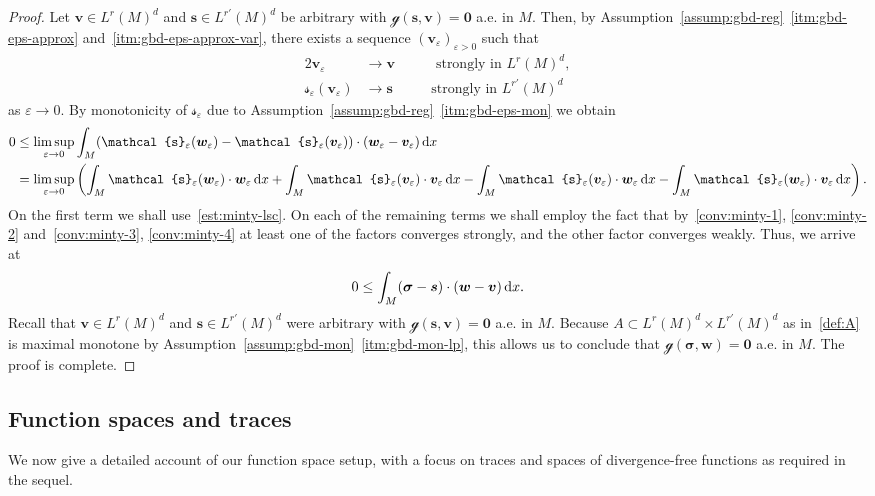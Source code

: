 \documentclass[reqno,a4paper]{amsart}
\def\vec#1{\boldsymbol{#1}}
\def\d{{\rm d}}
\def\dx{\,\d x}
\def\b0{\vec{0}}
\def\bs{\vec{s}}
\def\bv{\vec{v}}
\def\bw{\vec{w}}
\def\bsigma{\vec{\sigma}}
\def\gbd{\vec{\mathcal{g}}}
\def\Srel{\vec{\mathcal{s}}}
\def\Seps{\Srel_{\varepsilon}}
\begin{document}
	\begin{proof}
		Let $\bv \in L^r(M)^d$ and $\bs \in L^{r'}(M)^{d}$ be arbitrary with $\gbd(\bs,\bv)= \b0 $ a.e. in $M$. 
		Then, by Assumption~\ref{assump:gbd-reg}~\ref{itm:gbd-eps-approx} and~\ref{itm:gbd-eps-approx-var}, there exists a sequence $(\bv_{\varepsilon})_{\varepsilon>0}$ such that
		\begin{alignat}{2}\label{conv:minty-3}
			\bv_{\varepsilon} &\to \bv \quad &&\text{ strongly in } L^{r}(M)^d,\\ \label{conv:minty-4}
			\Seps(\bv_{\varepsilon}) &\to \bs && \text{strongly in } L^{r'}(M)^d
		\end{alignat}
		as $\varepsilon \to 0$. 
		By monotonicity of $\Seps$ due to Assumption~\ref{assump:gbd-reg}~\ref{itm:gbd-eps-mon} we obtain 
		\begin{align*}
			0&  \leq \limsup_{\varepsilon \to 0} \int_{M} (\Seps(\bw_{\varepsilon}) - \Seps(\bv_{\varepsilon})) \cdot (\bw_{\varepsilon} - \bv_{\varepsilon})  \dx \\
			&= \limsup_{\varepsilon \to 0}  
			\left( 
			\int_{M}  \Seps(\bw_{\varepsilon}) \cdot \bw_{\varepsilon}  \dx 
			+ 	\int_{M}  \Seps(\bv_{\varepsilon}) \cdot  \bv_{\varepsilon}  \dx 
			- 	\int_{M}   \Seps(\bv_{\varepsilon}) \cdot \bw_{\varepsilon} \dx 
			- 	\int_{M}  \Seps(\bw_{\varepsilon}) \cdot  \bv_{\varepsilon} \dx 
			\right).
		\end{align*}
		On the first term we shall use~\eqref{est:minty-lsc}. 
		On each of the remaining terms we shall employ the fact that by~\eqref{conv:minty-1}, \eqref{conv:minty-2} and~\eqref{conv:minty-3}, \eqref{conv:minty-4} at least one of the factors converges strongly, and the other factor converges weakly. 
		Thus, we arrive at 
		\begin{align*}
			0  \leq \int_{M}(\bsigma - \bs) \cdot  (\bw - \bv) \dx.
		\end{align*}
		Recall that  $\bv\in L^r(M)^d$ and $\bs \in L^{r'}(M)^d$ were arbitrary with $\gbd( \bs,\bv) = \b0$ a.e. in $M$.   
		Because $ A \subset L^r(M)^d \times L^{r'}(M)^d$ as in~\eqref{def:A} is maximal monotone by Assumption~\ref{assump:gbd-mon}~\ref{itm:gbd-mon-lp}, this allows us to conclude that $\gbd(\bsigma,\bw) = \b0$ a.e. in $M$. 
		The proof is complete. 
	\end{proof}
	
	
	\subsection{Function spaces and traces}\label{sec:fct-spaces} 
 We now give a detailed account of our function space setup, with a focus on traces and spaces of divergence-free functions as required in the sequel. 
\end{document}

